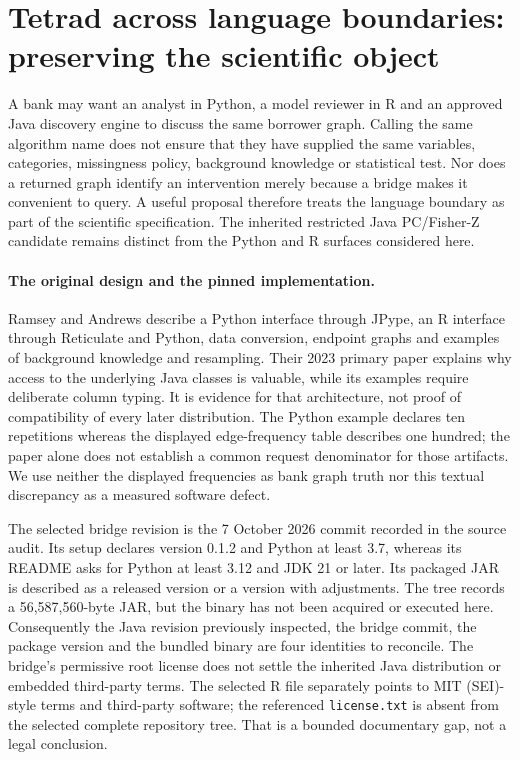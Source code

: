 \section{Tetrad across language boundaries: preserving the scientific object}
\label{sec:exec24-tetrad-bridge-reuse}

A bank may want an analyst in Python, a model reviewer in R and an approved
Java discovery engine to discuss the same borrower graph. Calling the same
algorithm name does not ensure that they have supplied the same variables,
categories, missingness policy, background knowledge or statistical test.
Nor does a returned graph identify an intervention merely because a bridge
makes it convenient to query. A useful proposal therefore treats the language
boundary as part of the scientific specification. The inherited restricted
Java PC/Fisher-Z candidate remains distinct from the Python and R surfaces
considered here.~\citep{exec13_tetrad_reuse_decision,exec24_pytetrad_source}

\paragraph{The original design and the pinned implementation.}
Ramsey and Andrews describe a Python interface through JPype, an R interface
through Reticulate and Python, data conversion, endpoint graphs and examples
of background knowledge and resampling. Their 2023 primary paper explains why
access to the underlying Java classes is valuable, while its examples require
deliberate column typing. It is evidence for that architecture, not proof of
compatibility of every later distribution. The Python example declares ten
repetitions whereas the displayed edge-frequency table describes one hundred;
the paper alone does not establish a common request denominator for those
artifacts. We use neither the displayed frequencies as bank graph truth nor
this textual discrepancy as a measured software defect.~\citep{exec24_pytetrad_paper}

The selected bridge revision is the 7 October 2026 commit recorded in the
source audit. Its setup declares version 0.1.2 and Python at least 3.7, whereas
its README asks for Python at least 3.12 and JDK 21 or later. Its packaged JAR
is described as a released version or a version with adjustments. The tree
records a 56,587,560-byte JAR, but the binary has not been acquired or executed
here. Consequently the Java revision previously inspected, the bridge commit,
the package version and the bundled binary are four identities to reconcile.
The bridge's permissive root license does not settle the inherited Java
distribution or embedded third-party terms. The selected R file separately
points to MIT (SEI)-style terms and third-party software; the referenced
\texttt{license.txt} is absent from the selected complete repository tree.
That is a bounded documentary gap, not a legal conclusion.
\citep{exec24_pytetrad_source,exec13_tetrad_reuse_primary}

